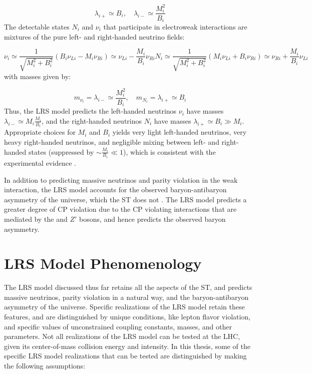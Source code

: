 \begin{equation}
	\lambda_{i+} \simeq B_{i},  \quad \lambda_{i-} \simeq \frac{M^{2}_{i}}{B_{i}}
\end{equation}
The detectable states $N_{i}$ and $\nu_{i}$ that participate in electroweak interactions are mixtures of the pure 
left- and right-handed neutrino fields:

\begin{equation}
	\nu_{i} \simeq \frac{1}{\sqrt{M^{2}_{i} + B^{2}_{i}}}(B_{i}\nu_{Li} - M_{i}\nu_{Ri}) \simeq \nu_{Li} - \frac{M_{i}}{B_{i}}\nu_{Ri}
	
	N_{i} \simeq \frac{1}{\sqrt{M^{2}_{i} + B^{2}_{i}}}(M_{i}\nu_{Li} + B_{i}\nu_{Ri}) \simeq \nu_{Ri} + \frac{M_{i}}{B_{i}}\nu_{Li}
\end{equation}
with masses given by:

\begin{equation}
	m_{\nu_{i}} = \lambda_{i-} \simeq \frac{M^{2}_{i}}{B_{i}} , \quad m_{N_{i}} = \lambda_{i+} \simeq B_{i}
\end{equation}
Thus, the LRS model predicts the left-handed neutrinos $\nu_{i}$ have masses $\lambda_{i-} \simeq M_{i}\frac{M_{i}}{B_{i}}$, 
and the right-handed neutrinos $N_{i}$ have masses $\lambda_{i+} \simeq B_{i} \gg M_{i}$.  Appropriate choices 
for $M_{i}$ and $B_{i}$ yields very light left-handed neutrinos, very heavy right-handed neutrinos, 
and negligible mixing between left- and right-handed states (suppressed by $\sim \frac{M_{i}}{B_{i}} \ll 1$), 
which is consistent with the experimental evidence \cite{dZeroMixingLimits,theoreticalMixingLimits}.

In addition to predicting massive neutrinos and parity violation in the weak interaction, the LRS model accounts 
for the observed baryon-antibaryon asymmetry of the universe, which the ST does not \cite{surveyOfExtensions}.  
The LRS model predicts a greater degree of CP violation due to the CP violating interactions that are mediated by 
the \WR and $Z'$ bosons, and hence predicts the observed baryon asymmetry.


\section{LRS Model Phenomenology}
\label{sec:lrsPhenomenology}
The LRS model discussed thus far retains all the aspects of the ST, and predicts 
massive neutrinos, parity violation in a natural way, and the baryon-antibaryon asymmetry of the universe.  
Specific realizations of the LRS model retain these features, and are distinguished by unique conditions, 
like lepton flavor violation, and specific values of unconstrained coupling constants, masses, and other 
parameters.  Not all realizations of the LRS model can be tested at the LHC, given its center-of-mass collision 
energy and intensity.  In this thesis, some of the specific LRS model realizations that can be tested are 
distinguished by making the following assumptions:

